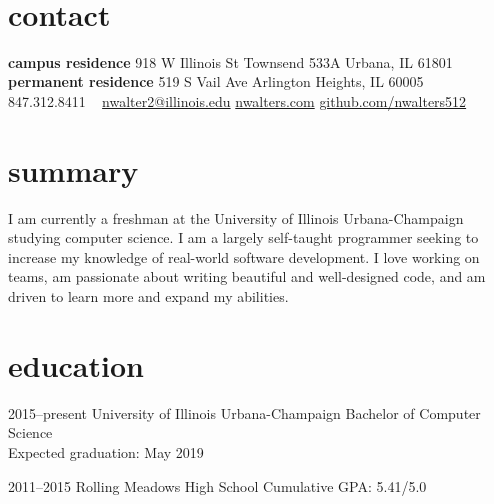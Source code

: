 \documentclass[nofooter]{resume}
\begin{document}


\begin{aside} %
~\vspace{0.0cm}
\section{contact}\vspace{0.25cm}
\textbf{campus residence}
918 W Illinois St
Townsend 533A
Urbana, IL
61801
~
\textbf{permanent residence}
519 S Vail Ave
Arlington Heights, IL
60005
~
847.312.8411
~
\href{mailto:nwalter2@illinois.edu}{nwalter2@illinois.edu}
\href{http://www.nwalters.com}{nwalters.com}
\href{http://github.com/nwalters512}{github.com/nwalters512}
\end{aside}



\vspace{0.1cm} %
\section{summary}

I am currently a freshman at the University of Illinois Urbana-Champaign studying computer science. I am a largely self-taught programmer seeking to increase my knowledge of real-world software development. I love working on teams, am passionate about writing beautiful and well-designed code, and am driven to learn more and expand my abilities.


\section{education}

\begin{entrylist}


\entry
{2015--present}
{University of Illinois Urbana-Champaign}
{}
{Bachelor of Computer Science \\
Expected graduation: May 2019}


\entry
{2011--2015}
{Rolling Meadows High School}
{}
{Cumulative GPA: 5.41/5.0}


\end{entrylist}
\end{document}
